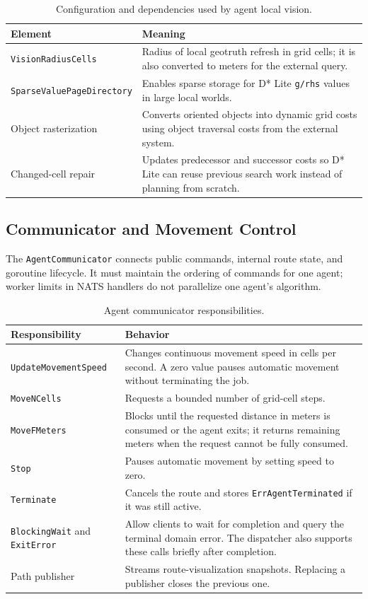 \documentclass[12pt,a4paper]{report}
\begin{document}
\begin{table}[H]
\centering
\begin{tabular}{|p{}|p{}|}
\hline
\textbf{Element} & \textbf{Meaning} \\
\hline
\texttt{VisionRadiusCells} &
Radius of local geotruth refresh in grid cells; it is also converted to meters
for the external query. \\
\hline
\texttt{SparseValuePageDirectory} &
Enables sparse storage for D* Lite \texttt{g/rhs} values in large local worlds. \\
\hline
Object rasterization &
Converts oriented objects into dynamic grid costs using object traversal costs
from the external system. \\
\hline
Changed-cell repair &
Updates predecessor and successor costs so D* Lite can reuse previous search
work instead of planning from scratch. \\
\hline
\end{tabular}
\caption{Configuration and dependencies used by agent local vision.}
\end{table}

\subsection{Communicator and Movement Control}

The \texttt{AgentCommunicator} connects public commands, internal route state,
and goroutine lifecycle. It must maintain the ordering of commands for one agent;
worker limits in NATS handlers do not parallelize one agent's algorithm.

\begin{table}[H]
\centering
\begin{tabular}{|p{}|p{}|}
\hline
\textbf{Responsibility} & \textbf{Behavior} \\
\hline
\texttt{UpdateMovementSpeed} &
Changes continuous movement speed in cells per second. A zero value pauses
automatic movement without terminating the job. \\
\hline
\texttt{MoveNCells} &
Requests a bounded number of grid-cell steps. \\
\hline
\texttt{MoveFMeters} &
Blocks until the requested distance in meters is consumed or the agent exits; it
returns remaining meters when the request cannot be fully consumed. \\
\hline
\texttt{Stop} &
Pauses automatic movement by setting speed to zero. \\
\hline
\texttt{Terminate} &
Cancels the route and stores \texttt{ErrAgentTerminated} if it was still active. \\
\hline
\texttt{BlockingWait} and \texttt{ExitError} &
Allow clients to wait for completion and query the terminal domain error. The
dispatcher also supports these calls briefly after completion. \\
\hline
Path publisher &
Streams route-visualization snapshots. Replacing a publisher closes the previous
one. \\
\hline
\end{tabular}
\caption{Agent communicator responsibilities.}
\end{table}
\end{document}
